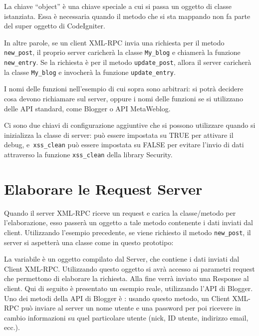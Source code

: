 La chiave ``object'' è una chiave speciale a cui si passa un oggetto di classe istanziata. Essa è necessaria quando il metodo che si sta mappando non fa parte del super oggetto di CodeIgniter.

In altre parole, se un client XML-RPC invia una richiesta per il metodo \verb|new_post|, il proprio server caricherà la classe \verb|My_blog| e chiamerà la funzione \verb|new_entry|. Se la richiesta è per il metodo \verb|update_post|, allora il server caricherà la classe \verb|My_blog| e invocherà la funzione \verb|update_entry|.

I nomi delle funzioni nell'esempio di cui sopra sono arbitrari: si potrà decidere cosa devono richiamare sul server, oppure i nomi delle funzioni se si utilizzano delle API standard, come  Blogger o API MetaWeblog.

Ci sono due chiavi di configurazione aggiuntive che si possono utilizzare quando si inizializza la classe di server:  può essere impostata su TRUE per attivare il debug, e\verb| xss_clean| può essere impostata su FALSE per evitare l'invio di dati attraverso la funzione \verb|xss_clean| della library Security.

\section*{Elaborare le Request Server}
Quando il server XML-RPC riceve un request e carica la classe/metodo per l'elaborazione, esso passerà un oggetto a tale metodo contenente i dati inviati dal client. Utilizzando l'esempio precedente, se viene richiesto il metodo \verb|new_post|, il server si aspetterà una classe come in questo prototipo:


La variabile  è un oggetto compilato dal Server, che contiene i dati inviati dal Client XML-RPC. Utilizzando questo oggetto si avrà accesso ai parametri request che permettono di elaborare la richiesta. Alla fine verrà inviato una Response al client. Qui di seguito è presentato un esempio reale, utilizzando l'API di Blogger. Uno dei metodi della API di Blogger è : usando questo metodo, un Client XML-RPC può inviare al server un nome utente e una password per poi ricevere in cambio informazioni su quel particolare utente (nick, ID utente, indirizzo email, ecc.).

